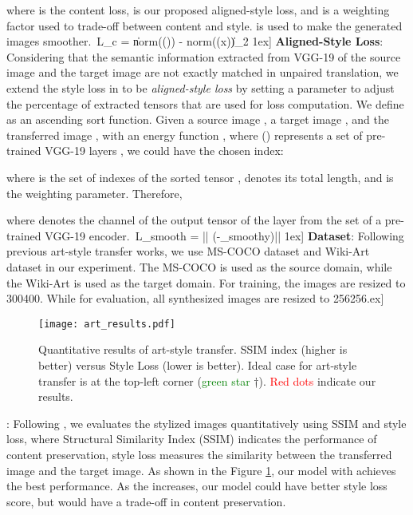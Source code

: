 \documentclass[runningheads]{llncs}
\begin{document}
where  is the content loss,  is our proposed aligned-style loss, and 
 is a weighting factor used to trade-off between content and style.  is used to make the generated images smoother.\
      L_{c} = \left \|norm(\phi()) - norm(\phi(x))\right \|_2
1ex]
\noindent\textbf{Aligned-Style Loss}:
Considering that the semantic information extracted from VGG-19 of the source image and the target image are not exactly matched in unpaired translation, we extend the style loss in \cite{huang2017arbitrary} to be \textit{aligned-style loss} by setting a parameter  to adjust the percentage of extracted tensors that are used for loss computation. We define  as an ascending sort function. Given a source image , a target image , and the transferred image , with an energy function , where  () represents a set of pre-trained VGG-19 layers , we could have the chosen index:

where  is the set of indexes of the sorted tensor ,  denotes its total length, and  is the weighting parameter. Therefore,

where  denotes the  channel of the output tensor of the  layer from the set   of a pre-trained VGG-19 encoder.\
      L_{smooth} = ||\nabla{} \exp(-\lambda_{smooth}\nabla y)||
1ex]
\noindent\textbf{Dataset}: Following previous art-style transfer works, we use MS-COCO\cite{lin2014microsoft} dataset and Wiki-Art\cite{wikiart} dataset in our experiment. The MS-COCO is used as the source domain, while the Wiki-Art is used as the target domain. For training, the images are resized to 300400. While for evaluation, all synthesized images are resized to 256256.\1ex]
\begin{figure}[!ht]
  \centering
  \texttt{[image: art\_results.pdf]}
  \caption{Quantitative results of art-style transfer. SSIM index (higher is better) versus Style Loss (lower is better). Ideal case for art-style transfer is at the top-left corner (\textcolor{green}{green star} †). \textcolor{red}{Red dots} indicate our results.}
  \label{fig:style}
\end{figure}
:
Following \cite{Hong_2021_ICCV}, we evaluates the stylized images quantitatively using SSIM and style loss, where Structural Similarity Index (SSIM) indicates the performance of content preservation, style loss measures the similarity between the transferred image and the target image. As shown in the Figure \ref{fig:style}, our model with  achieves the best performance. As the  increases, our model could have better style loss score, but would have a trade-off in content preservation.
\end{document}
